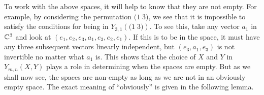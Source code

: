 
To work with the above spaces, it will help to know that they are not
empty. For example, by considering the permutation $\big(1\; 3\big)$,
we see that it is impossible to satisfy the 
conditions for being in $Y_{3,1}\left(\big(1\; 3\big)\right)$. To see
this, take any vector $a_1$ in $\mathbb{C}^3$ and look at
$(e_1,e_2,e_3,a_1,e_3,e_2,e_1)$. If this is to be in the space, it
must have any three subsequent vectors linearly independent, but
$(e_3,a_1,e_3)$ is not invertible no matter what $a_1$ is. This shows
that the choice of $X$ and $Y$ in $Y_{m,n}(X,Y)$ plays a role in
determining when the spaces are empty. But as we shall now see, the
spaces are non-empty as long as we are not in an obviously empty
space. The exact meaning of ``obviously'' is given in the following
lemma.


